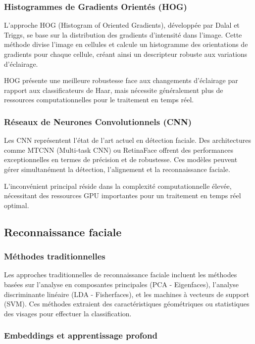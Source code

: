 \documentclass[12pt,a4paper]{article}
\begin{document}
\subsubsection{Histogrammes de Gradients Orientés (HOG)}

L'approche HOG (Histogram of Oriented Gradients), développée par Dalal et Triggs, se base sur la distribution des gradients d'intensité dans l'image. Cette méthode divise l'image en cellules et calcule un histogramme des orientations de gradients pour chaque cellule, créant ainsi un descripteur robuste aux variations d'éclairage.

HOG présente une meilleure robustesse face aux changements d'éclairage par rapport aux classificateurs de Haar, mais nécessite généralement plus de ressources computationnelles pour le traitement en temps réel.

\subsubsection{Réseaux de Neurones Convolutionnels (CNN)}

Les CNN représentent l'état de l'art actuel en détection faciale. Des architectures comme MTCNN (Multi-task CNN) ou RetinaFace offrent des performances exceptionnelles en termes de précision et de robustesse. Ces modèles peuvent gérer simultanément la détection, l'alignement et la reconnaissance faciale.

L'inconvénient principal réside dans la complexité computationnelle élevée, nécessitant des ressources GPU importantes pour un traitement en temps réel optimal.

\subsection{Reconnaissance faciale}

\subsubsection{Méthodes traditionnelles}

Les approches traditionnelles de reconnaissance faciale incluent les méthodes basées sur l'analyse en composantes principales (PCA - Eigenfaces), l'analyse discriminante linéaire (LDA - Fisherfaces), et les machines à vecteurs de support (SVM). Ces méthodes extraient des caractéristiques géométriques ou statistiques des visages pour effectuer la classification.

\subsubsection{Embeddings et apprentissage profond}
\end{document}
